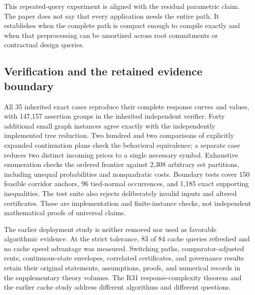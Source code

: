 This repeated-query experiment is aligned with the residual parametric claim. The paper does not say that every application needs the entire path. It establishes when the complete path is compact enough to compile exactly and when that preprocessing can be amortized across root commitments or contractual design queries.

\subsection{Verification and the retained evidence boundary}
All 35 inherited exact cases reproduce their complete response curves and values, with 147,157 assertion groups in the inherited independent verifier. Forty additional small graph instances agree exactly with the independently implemented tree reduction. Two hundred and two comparisons of explicitly expanded continuation plans check the behavioral equivalence; a separate case reduces two distinct incoming prices to a single necessary symbol. Exhaustive enumeration checks the ordered frontier against 2,308 arbitrary set partitions, including unequal probabilities and nonquadratic costs. Boundary tests cover 150 feasible corridor anchors, 96 tied-normal occurrences, and 1,185 exact supporting inequalities. The test suite also rejects deliberately invalid inputs and altered certificates. These are implementation and finite-instance checks, not independent mathematical proofs of universal claims.

The earlier deployment study is neither removed nor used as favorable algorithmic evidence. At the strict tolerance, 83 of 84 cache queries refreshed and no cache speed advantage was measured. Switching paths, comparator-adjusted rents, continuous-state envelopes, correlated certificates, and governance results retain their original statements, assumptions, proofs, and numerical records in the supplementary theory volumes. The R31 response-complexity theorem and the earlier cache study address different algorithms and different questions.